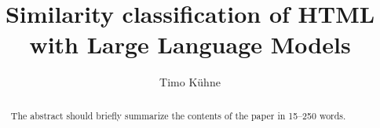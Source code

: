 \documentclass[runningheads]{llncs}
\begin{document}
%
\title{Similarity classification of HTML with Large Language Models}
%
%
%
\author{Timo Kühne}
%
\maketitle %
%
%
\begin{abstract}
The abstract should briefly summarize the contents of the paper in
15--250 words.

\end{abstract}
%
%


%
%
\appendix

%
%


%
\end{document}
